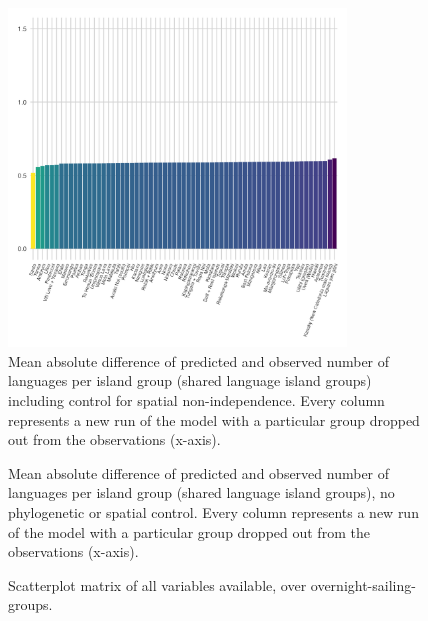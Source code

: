 \documentclass[12pt,letterpaper]{article}
\begin{document}
\begin{figure}[ht]
\centering
\includegraphics[width=0.8\textwidth]{brms_medium_control_spatial_dropped_out_plot_diff.png}
\caption{Mean absolute difference of predicted and observed number of languages per island group (shared language island groups) including control for spatial non-independence. Every column represents a new run of the model with a particular group dropped out from the observations (x-axis).}
\label{appendix_medium_control_spatial_dropped_out_plot_diff}
\end{figure}

\begin{figure}[ht]
\centering
\caption{Mean absolute difference of predicted and observed number of languages per island group (shared language island groups), no phylogenetic or spatial control. Every column represents a new run of the model with a particular group dropped out from the observations (x-axis).}
\label{appendix_medium_control_none_dropped_out_plot_diff}
\end{figure}














\begin{figure}[ht]
\centering
\caption{Scatterplot matrix of all variables available, over overnight-sailing-groups.}
\label{appendix_SPLOM_SBZR_all_variables}
\end{figure}
\end{document}
